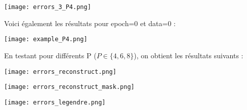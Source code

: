 \begin{minipage}{\linewidth}
	\centering
	\texttt{[image: errors\_3\_P4.png]}
\end{minipage}

Voici également les résultats pour epoch=0 et data=0 :

\begin{minipage}{\linewidth}
	\centering
	\texttt{[image: example\_P4.png]}
\end{minipage}

\newpage

En testant pour différents P ($P\in\{4,6,8\}$), on obtient les résultats suivants :

\begin{minipage}{\linewidth}
	\centering
	\texttt{[image: errors\_reconstruct.png]}
\end{minipage}


\begin{minipage}{\linewidth}
	\centering
	\texttt{[image: errors\_reconstruct\_mask.png]}
\end{minipage}


\begin{minipage}{\linewidth}
	\centering
	\texttt{[image: errors\_legendre.png]}
\end{minipage}

